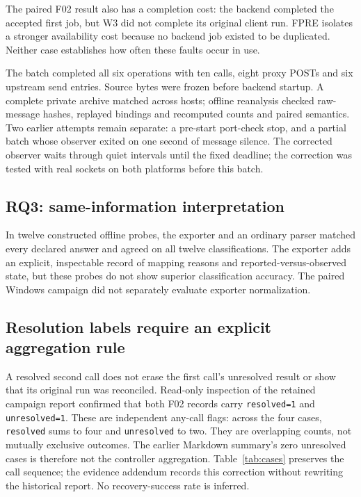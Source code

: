 \documentclass{ieeeaccess}
\begin{document}
The paired F02 result also has a completion cost: the backend completed the
accepted first job, but W3 did not complete its original client run. FPRE
isolates a stronger availability cost because no backend job existed to be
duplicated. Neither case establishes how often these faults occur in use.

The batch completed all six operations with ten calls, eight proxy POSTs and
six upstream send entries. Source bytes were frozen before backend startup.
A complete private archive matched across hosts; offline reanalysis checked
raw-message hashes, replayed bindings and recomputed counts and paired semantics.
Two earlier attempts remain separate: a pre-start port-check stop, and a partial
batch whose observer exited on one second of message silence. The corrected
observer waits through quiet intervals until the fixed deadline; the correction
was tested with real sockets on both platforms before this batch.

\subsection{RQ3: same-information interpretation}

In twelve constructed offline probes, the exporter and an ordinary parser
matched every declared answer and agreed on all twelve classifications.
The exporter adds an explicit, inspectable record of mapping reasons and
reported-versus-observed state, but these probes do not show superior
classification accuracy. The paired Windows campaign did not separately
evaluate exporter normalization.

\subsection{Resolution labels require an explicit aggregation rule}

A resolved second call does not erase the first call's unresolved result or
show that its original run was reconciled. Read-only inspection of the retained
campaign report confirmed that both F02 records carry \texttt{resolved=1} and
\texttt{unresolved=1}. These are independent any-call flags: across the four cases,
\texttt{resolved} sums to four and \texttt{unresolved} to two. They are overlapping counts,
not mutually exclusive outcomes. The earlier Markdown summary's zero unresolved
cases is therefore not the controller aggregation. Table~\ref{tab:cases} preserves the call
sequence; the evidence addendum records this correction without rewriting the
historical report. No recovery-success rate is inferred.
\end{document}
